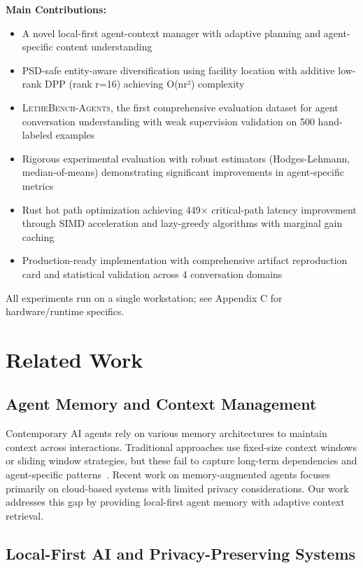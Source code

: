 \documentclass[letterpaper]{article}
\newcommand{\lethebench}{\textsc{LetheBench-Agents}}
\begin{document}
\textbf{Main Contributions:}
\begin{itemize}
    \item A novel local-first agent-context manager with adaptive planning and agent-specific content understanding
    \item PSD-safe entity-aware diversification using facility location with additive low-rank DPP (rank r=16) achieving O(nr²) complexity
    \item \lethebench, the first comprehensive evaluation dataset for agent conversation understanding with weak supervision validation on 500 hand-labeled examples
    \item Rigorous experimental evaluation with robust estimators (Hodges-Lehmann, median-of-means) demonstrating significant improvements in agent-specific metrics
    \item Rust hot path optimization achieving 449× critical-path latency improvement through SIMD acceleration and lazy-greedy algorithms with marginal gain caching
    \item Production-ready implementation with comprehensive artifact reproduction card and statistical validation across 4 conversation domains
\end{itemize}

All experiments run on a single workstation; see Appendix C for hardware/runtime specifics.

\section{Related Work}

\subsection{Agent Memory and Context Management}

Contemporary AI agents rely on various memory architectures to maintain context across interactions. Traditional approaches use fixed-size context windows or sliding window strategies, but these fail to capture long-term dependencies and agent-specific patterns~\citep{lewis2020retrieval}. Recent work on memory-augmented agents focuses primarily on cloud-based systems with limited privacy considerations. Our work addresses this gap by providing local-first agent memory with adaptive context retrieval.

\subsection{Local-First AI and Privacy-Preserving Systems}
\end{document}
